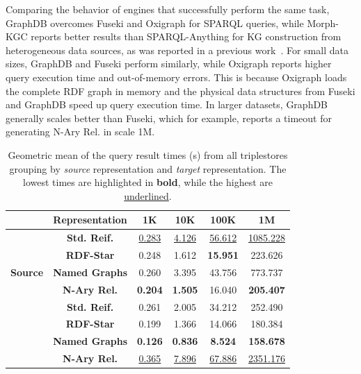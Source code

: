 Comparing the behavior of engines that successfully perform the same task, GraphDB overcomes Fuseki and Oxigraph for SPARQL queries, while Morph-KGC reports better results than SPARQL-Anything for KG construction from heterogeneous data sources, as was reported in a previous work~\parencite{arenas2023morphstar}.
For small data sizes, GraphDB and Fuseki perform similarly, while Oxigraph reports higher query execution time and out-of-memory errors. This is because Oxigraph loads the complete RDF graph in memory and the physical data structures from Fuseki and GraphDB speed up query execution time. In larger datasets, GraphDB generally scales better than Fuseki, which for example, reports a timeout for generating N-Ary Rel. in scale 1M. 



\begin{table}[t!]
\caption[Execution time results for re-construction evaluation with triplestores]{Geometric mean of the query result times (s) from all triplestores grouping by \textit{source} representation and \textit{target} representation. The lowest times are highlighted in \textbf{bold}, while the highest are \underline{underlined}.}
\centering
\label{tab:chp6-1_closeup-queries}
\resizebox{0.6\columnwidth}{!}
{\begin{tabular}{cccccc}
    \cmidrule{2-6}
 & \textbf{Representation} & \textbf{1K} & \textbf{10K} & \textbf{100K} & \textbf{1M} \\ \midrule
\multirow{5}{*}{\textbf{Source}} & \textbf{Std. Reif.} & \underline{0.283} & \underline{4.126} & \underline{56.612} & \underline{1085.228} \\ \cmidrule{2-6}
& \textbf{RDF-Star} & 0.248 & 1.612 & \textbf{15.951} & 223.626 \\ \cmidrule{2-6}
& \textbf{Named Graphs} & 0.260 & 3.395 & 43.756 & 773.737 \\ \cmidrule{2-6}
& \textbf{N-Ary Rel.} & \textbf{0.204} & \textbf{1.505} & 16.040 & \textbf{205.407} \\ \midrule \midrule
\multirow{5}{*}{\textbf{Target}} & \textbf{Std. Reif.} & 0.261 & 2.005 & 34.212 & 252.490 \\ \cmidrule{2-6}
& \textbf{RDF-Star}  & 0.199 & 1.366 & 14.066 & 180.384 \\ \cmidrule{2-6}
& \textbf{Named Graphs} & \textbf{0.126} & \textbf{0.836} & \textbf{8.524} & \textbf{158.678} \\ \cmidrule{2-6} 
& \textbf{N-Ary Rel.} & \underline{0.365} & \underline{7.896} & \underline{67.886} & \underline{2351.176}   \\   \bottomrule
\end{tabular}}
\end{table}

